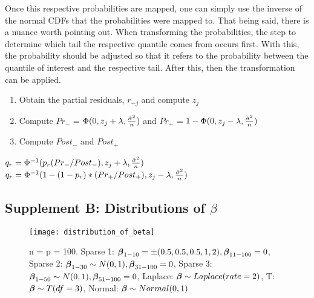 
Once this respective probabilities are mapped, one can simply use the inverse of the normal CDFs that the probabilities were mapped to. That being said, there is a nuance worth pointing out. When transforming the probabilities, the step to determine which tail the respective quantile comes from occurs first. With this, the probability should be adjusted so that it refers to the probability between the quantile of interest and the respective tail. After this, then the transformation can be applied.

\begin{enumerate}
	\item Obtain the partial residuals, $r_{-j}$ and compute $z_j$
	\item Compute $Pr_{-}$ = $\Phi(0, z_j + \lambda, \frac{\hat{\sigma}^2}{n})$ and $Pr_{+}$ = $1 - \Phi(0, z_j - \lambda, \frac{\hat{\sigma}^2}{n})$
	\item Compute $Post_-$ and $Post_+$
\end{enumerate}
\begin{algorithmic}
    \State $q_r = \Phi^{-1}(p_r(Pr_{-} / Post_{-}), z_j + \lambda, \frac{\hat{\sigma}^2}{n})$
  \Else
      \State $q_r = \Phi^{-1}(1 - (1 - p_r)*(Pr_{+} / Post_{+}), z_j - \lambda, \frac{\hat{\sigma}^2}{n})$
  \EndIf
\end{algorithmic}
  
\subsection{Supplement B: Distributions of \texorpdfstring{$\beta$}{beta}}\label{Sup:distributions} 

\begin{figure}
  \texttt{[image: distribution\_of\_beta]}
  \caption{\label{Fig:distribution_of_beta} n = p = 100. Sparse 1: $\boldsymbol{\beta}_{1-10} = \pm(0.5, 0.5, 0.5, 1, 2), \boldsymbol{\beta}_{11-100} = 0$, Sparse 2: $\boldsymbol{\beta}_{1-30} \sim N(0, 1), \boldsymbol{\beta}_{31-100} = 0$, Sparse 3: $\boldsymbol{\beta}_{1-50} \sim N(0, 1), \boldsymbol{\beta}_{51-100} = 0$, Laplace: $\boldsymbol{\beta} \sim Laplace(rate = 2)$, T: $\boldsymbol{\beta} \sim T(df = 3)$, Normal: $\boldsymbol{\beta} \sim Normal(0, 1)$}
\end{figure}